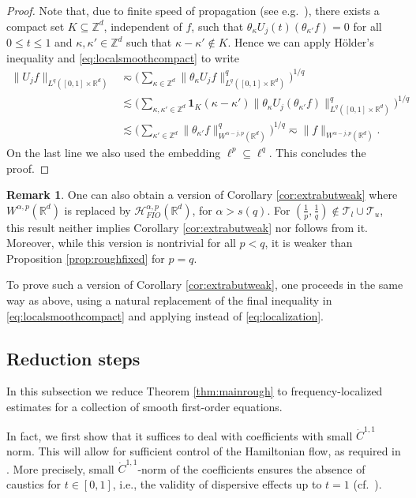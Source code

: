 \documentclass{amsart}
\numberwithin{equation}{section}
\theoremstyle{definition}
\newtheorem{remark}[theorem]{Remark}
\newcommand{\Rd}{\mathbb{R}^{d}}
\newcommand{\Z}{\mathbb{Z}}
\newcommand {\HT}{\mathcal{H}}
\newcommand {\ind}{{\mathbf{1}}}
\begin{document}
\begin{proof}
Note that, due to finite speed of propagation (see e.g.~\cite[Remark 1.8]{Colombini-Metivier08}), there exists a compact set $K\subseteq \Z^{d}$, independent of $f$, such that $\theta_{\kappa}U_{j}(t)(\theta_{\kappa'}f)=0$ for all $0\leq t\leq 1$ and $\kappa,\kappa'\in\Z^{d}$ such that $\kappa-\kappa'\notin K$. 
Hence we can apply H\"{o}lder's inequality and \eqref{eq:localsmoothcompact} to write
\begin{align*}
\|U_{j}f\|_{L^{q}([0,1]\times\Rd)} &\eqsim \Big(\sum_{\kappa\in \Z^{d}}\|\theta_{\kappa}U_{j}f\|_{L^{q}([0,1]\times\Rd)}^{q}\Big)^{1/q}\\  
&\lesssim  \Big(\sum_{\kappa,\kappa'\in \Z^{d}}\ind_{K}(\kappa-\kappa')\|\theta_{\kappa}U_{j}(\theta_{\kappa'}f)\|_{L^{q}([0,1]\times\Rd)}^{q}\Big)^{1/q}\\
&\lesssim \Big(\sum_{\kappa'\in \Z^{d}}\|\theta_{\kappa'}f\|_{W^{\alpha-j,p}(\Rd)}^{q}\Big)^{1/q} \eqsim \|f\|_{{W^{\alpha-j,p}(\Rd)}}.
\end{align*}
On the last line we also used the embedding $\ell^{p}\subseteq \ell^{q}$. This concludes the proof.
\end{proof}

\begin{remark}\label{rem:nontrivialsmoothing}
One can also obtain a version of Corollary \ref{cor:extrabutweak} where $W^{\alpha,p}(\Rd)$ is replaced by $\HT^{\alpha,p}_{FIO}(\Rd)$, for $\alpha>s(q)$. For $(\frac{1}{p},\frac{1}{q})\notin \mathcal{T}_{l}\cup \mathcal{T}_{u}$, this result neither implies Corollary \ref{cor:extrabutweak} nor follows from it. Moreover, while this version is nontrivial for all $p<q$, it is weaker than Proposition \ref{prop:roughfixed} for $p=q$.

To prove such a version of Corollary \ref{cor:extrabutweak}, one proceeds in the same way as above, using a natural replacement of the final inequality in \eqref{eq:localsmoothcompact} and applying \cite[Theorem 3.6]{LiRoSoYa24} instead of \eqref{eq:localization}.
\end{remark}

\subsection{Reduction steps}\label{subsec:reduction}

In this subsection we reduce Theorem \ref{thm:mainrough} to frequency-localized estimates for a collection of smooth first-order equations. 

In fact, we first show that it suffices to deal with coefficients with small $\dot{C}^{1,1}$ norm. This will allow for sufficient control of the Hamiltonian flow, as required in \cite{SchippaTataru2025}.  
More precisely, small $\dot{C}^{1,1}$-norm of the coefficients ensures the absence of caustics for $t \in [0,1]$, i.e., the validity of dispersive effects up to $t=1$ (cf.~\cite{Geba-Tataru05}).
\end{document}
